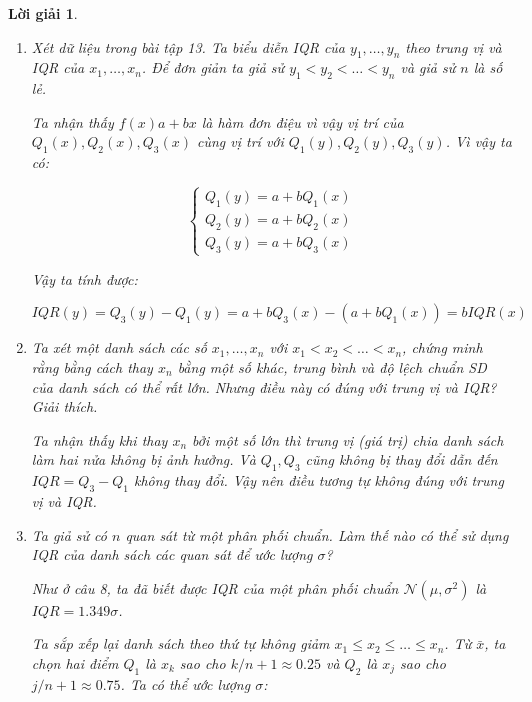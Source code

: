 \documentclass[14pt, a4paper]{article}
\theoremstyle{sltheorem}
\theoremstyle{soltheorem}
\newtheorem*{loigiai}{Lời giải}
\begin{document}
\begin{loigiai}
\begin{enumerate}[wide, labelwidth=!, labelindent=0pt,label=\textbf{\arabic*}.]
        \item Xét dữ liệu trong bài tập 13. Ta biểu diễn IQR của $y_1, \dots, y_n$ theo trung vị và IQR của $x_1, \dots, x_n$.
        Để đơn giản ta giả sử $y_1 < y_2 < \dots < y_n$ và giả sử $n$ là số lẻ.

        Ta nhận thấy $f(x) a + bx$ là hàm đơn điệu vì vậy vị trí của $Q_1(x), Q_2(x), Q_3 (x)$ cùng vị trí với $Q_1(y), Q_2(y), Q_3(y)$.
        Vì vậy ta có:

        \begin{equation*}
            \begin{cases}
                Q_1 (y) = a + bQ_1(x) \\
                Q_2 (y) = a + b Q_2(x) \\
                Q_3 (y) = a + b Q_3(x)
            \end{cases}
        \end{equation*}

        Vậy ta tính được:

        \begin{equation*}
            IQR(y) = Q_3 (y) - Q_1 (y) = a + b Q_3(x) - (a + b Q_1(x)) = b IQR(x)
        \end{equation*}

        \item Ta xét một danh sách các số $x_1, \dots, x_n$ với $x_1 < x_2 < \dots < x_n$, chứng minh rằng bằng cách thay $x_n$ bằng một số khác, trung bình và độ lệch chuẩn SD của danh sách có thể rất lớn.
        Nhưng điều này có đúng với trung vị và IQR? Giải thích.

        Ta nhận thấy khi thay $x_n$ bởi một số lớn thì trung vị (giá trị) chia danh sách làm hai nửa không bị ảnh hưởng.
        Và $Q_1, Q_3$ cũng không bị thay đổi dẫn đến $IQR = Q_3 - Q_1$ không thay đổi. 
        Vậy nên điều tương tự không đúng với trung vị và IQR.

        \item Ta giả sử có $n$ quan sát từ một phân phối chuẩn. Làm thế nào có thể sử dụng IQR của danh sách các quan sát để ước lượng $\sigma$?
        
        Như ở câu 8, ta đã biết được IQR của một phân phối chuẩn $\mathcal{N}(\mu, \sigma^2)$ là $IQR=1.349\sigma$.

        Ta sắp xếp lại danh sách theo thứ tự không giảm $x_1 \leq x_2 \leq \dots \leq x_n$.
        Từ $\bar{x}$, ta chọn hai điểm $Q_1$ là $x_k$ sao cho $k / n + 1 \approx 0.25$ và $Q_2$ là $x_j$ sao cho $j/ n+1 \approx 0.75$.
        Ta có thể ước lượng $\sigma$:


\end{enumerate}
\end{loigiai}
\end{document}
